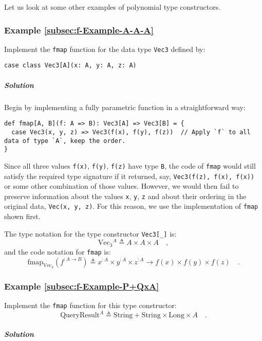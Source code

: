 Let us look at some other examples of polynomial type constructors.

\subsubsection{Example \label{subsec:f-Example-A-A-A}\ref{subsec:f-Example-A-A-A}}

Implement the \lstinline!fmap! function for the data type \lstinline!Vec3!
defined by:
\begin{lstlisting}
case class Vec3[A](x: A, y: A, z: A)
\end{lstlisting}


\subparagraph{Solution}

Begin by implementing a fully parametric function in a straightforward
way:
\begin{lstlisting}
def fmap[A, B](f: A => B): Vec3[A] => Vec3[B] = {
  case Vec3(x, y, z) => Vec3(f(x), f(y), f(z))  // Apply `f` to all data of type `A`, keep the order.
}
\end{lstlisting}
Since all three values \lstinline!f(x)!, \lstinline!f(y)!, \lstinline!f(z)!
have type \lstinline!B!, the code of \lstinline!fmap! would still
satisfy the required type signature if it returned, say, \lstinline!Vec3(f(z), f(x), f(x))!
or some other combination of those values. However, we would then
fail to preserve information about the values \lstinline!x!, \lstinline!y!,
\lstinline!z! and about their ordering in the original data, \lstinline!Vec(x, y, z)!.
For this reason, we use the implementation of \lstinline!fmap! shown
first.

The type notation for the type constructor \lstinline!Vec3[_]! is:
\[
\text{Vec}_{3}{}^{A}\triangleq A\times A\times A\quad,
\]
and the code notation for \lstinline!fmap! is:
\[
\text{fmap}_{\text{Vec}_{3}}(f^{:A\rightarrow B})\triangleq x^{:A}\times y^{:A}\times z^{:A}\rightarrow f(x)\times f(y)\times f(z)\quad.
\]


\subsubsection{Example \label{subsec:f-Example-P+QxA}\ref{subsec:f-Example-P+QxA}}

Implement the \lstinline!fmap! function for this type constructor:
\[
\text{QueryResult}^{A}\triangleq\text{String}+\text{String}\times\text{Long}\times A\quad.
\]


\subparagraph{Solution}

